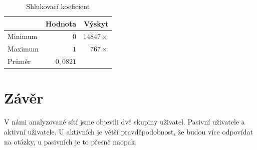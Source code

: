 \documentclass[a4paper,12pt]{article}
\begin{document}
\begin{table}[h!]
\centering
\begin{tabular}{l | r | r}
		&	Hodnota	& Výskyt \\
\hline
Minimum	&	$0$			& $14 847 \times$ \\
Maximum	&	$1$			& $767 \times$	\\
Průměr	&	$0,0821$	&
\end{tabular}
\caption{Shlukovací koeficient}
\label{tab:cluster}
\end{table}

\newpage
\section{Závěr}
V námi analyzované sítí jsme objevili dvě skupiny uživatel. Pasivní uživatele a aktivní uživatele.
U aktivních je větší pravděpodobnost, že budou více odpovídat na otázky, u pasivních je to přesně
naopak.



\end{document}
